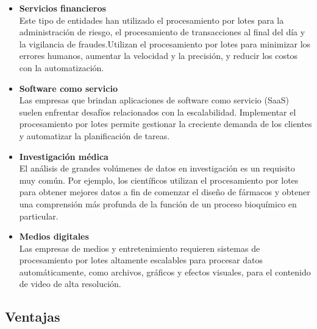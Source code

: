 \documentclass[12pt]{article}
\begin{document}
\begin{itemize}
    \item \textbf{Servicios financieros}\\
    Este tipo de entidades han utilizado el procesamiento por lotes para la administración de riesgo, el procesamiento de transacciones al
    final del día y la vigilancia de fraudes.Utilizan el procesamiento por lotes para minimizar los errores humanos, aumentar la velocidad
    y la precisión, y reducir los costos con la automatización.

    \item \textbf{Software como servicio}\\
    Las empresas que brindan aplicaciones de software como servicio (SaaS) suelen enfrentar desafíos relacionados con la escalabilidad. 
    Implementar el procesamiento por lotes permite gestionar la creciente demanda de los clientes y automatizar la planificación de tareas. 

    \item \textbf{Investigación médica}\\
    El análisis de grandes volúmenes de datos en investigación es un requisito muy común. Por ejemplo, los científicos utilizan el 
    procesamiento por lotes para obtener mejores datos a fin de comenzar el diseño de fármacos y obtener una comprensión más profunda de 
    la función de un proceso bioquímico en particular. 

    \item \textbf{Medios digitales}\\
    Las empresas de medios y entretenimiento requieren sistemas de procesamiento por lotes altamente escalables para procesar datos 
    automáticamente, como archivos, gráficos y efectos visuales, para el contenido de video de alta resolución.
\end{itemize}

\subsection{Ventajas}
\end{document}
